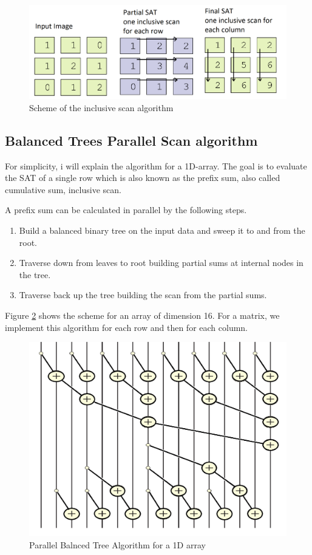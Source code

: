    \begin{figure}[h!]
   	\centering
   	\includegraphics[width=\textwidth]{imm/iia/inclusive_scan}  
   	\caption{Scheme of the inclusive scan algorithm} 
   	\label{fig:inclusive_scan}
   \end{figure}
 
 \subsection{Balanced Trees Parallel Scan algorithm}
 For simplicity, i will explain the algorithm for a 1D-array.
 The goal is to evaluate the SAT of a single row which is also known as the prefix sum, also called cumulative sum, inclusive scan. \cite{sat1}
 
 A prefix sum can be calculated in parallel by the following steps.

 \begin{enumerate}
 \item Build a balanced binary tree on the input data and sweep it to and from the root. 
 \item Traverse down from leaves to root building partial sums at internal nodes in the tree. 
 \item Traverse back up the tree building the scan from the partial sums.
 \end{enumerate}
 
  
 Figure \ref{fig:Balanced_tree} shows the scheme for an array of dimension 16.
 For a matrix, we implement this algorithm for each row and then for each column.
 
 \begin{figure}[h!]
 	\centering
 	\includegraphics[width=\textwidth]{imm/iia/Balanced_tree0}  
 	\caption{Parallel Balnced Tree Algorithm for a 1D array} 
 	\label{fig:Balanced_tree}
 \end{figure}
 
